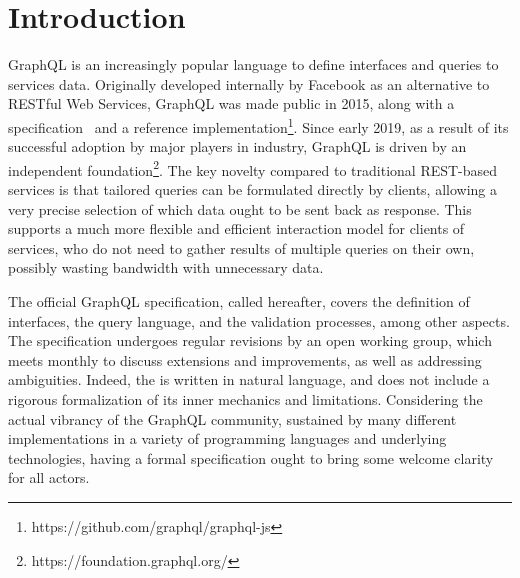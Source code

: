 \section{Introduction}


GraphQL is an increasingly popular language to define interfaces and queries to services data. Originally developed internally by Facebook as an alternative to RESTful Web Services, GraphQL was made public in 2015, along with a specification~\cite{gqlspec} and a reference implementation\footnote{https://github.com/graphql/graphql-js}. Since early 2019, as a result of its successful adoption by major players in industry,
GraphQL is driven by an independent foundation\footnote{https://foundation.graphql.org/}. The key novelty compared to traditional REST-based services is that tailored queries can be formulated directly by clients, allowing a very precise selection of which data ought to be sent back as response. This supports a much more flexible and efficient interaction model for clients of services, who do not need to gather results of multiple queries on their own, possibly wasting bandwidth with unnecessary data.


The official GraphQL specification, called \spec{} hereafter, 
covers the definition of interfaces, the query language, and the validation processes, among other aspects. The specification undergoes regular revisions by an open working group, which meets monthly to discuss extensions and improvements, as well as addressing ambiguities. Indeed, the \spec{} is written in natural language, and does not include a rigorous formalization of  its inner mechanics and limitations.
Considering the actual vibrancy of the GraphQL community, sustained by many different implementations in a variety of programming languages and underlying technologies, having a formal specification ought to bring some welcome clarity for all actors.

